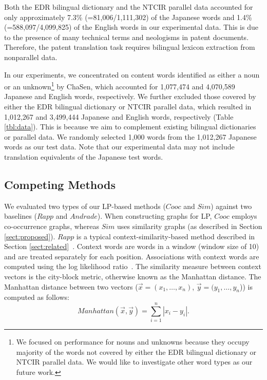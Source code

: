 \documentclass[english]{jnlp_1.4}
\begin{document}
Both the EDR bilingual dictionary and the NTCIR parallel data accounted for only approximately 7.3\% (=81,006/1,111,302) of the Japanese words and 1.4\% (=588,097/4,099,825) of the English words in our experimental data. 
This is due to the presence of many technical terms and neologisms in patent documents. 
Therefore, the patent translation task requires bilingual lexicon extraction from nonparallel data. 

In our experiments, we concentrated on content words identified as either a noun or an unknown\footnote{We focused on performance for nouns and unknowns because they occupy majority of the words not covered by either the EDR bilingual dictionary or NTCIR parallel data. We would like to investigate other word types as our future work.} by ChaSen, which accounted for 1,077,474 and 4,070,589 Japanese and English words, respectively. 
We further excluded those covered by either the EDR bilingual dictionary or NTCIR parallel data, which resulted in 1,012,267 and 3,499,444 Japanese and English words, respectively (Table \ref{tbl:data}). 
This is because we aim to complement existing bilingual dictionaries or parallel data. 
We randomly selected 1,000 words from the 1,012,267 Japanese words as our test data. 
Note that our experimental data may not include translation equivalents of the Japanese test words. 


\subsection{Competing Methods}
\label{sect:method}

We evaluated two types of our LP-based methods ($\mathit{Cooc}$ and $\mathit{Sim}$) against two baselines ($\mathit{Rapp}$ and $\mathit{Andrade}$). 
When constructing graphs for LP, $\mathit{Cooc}$ employs co-occurrence graphs, whereas $\mathit{Sim}$ uses similarity graphs (as described in Section \ref{sect:proposed}). 
$\mathit{Rapp}$ is a typical context-similarity-based method described in Section \ref{sect:related}~\cite{rapp99}. 
Context words are words in a window (window size of 10) and are treated separately for each position. 
Associations with context words are computed using the log likelihood ratio~\cite{dunning93}. 
The similarity measure between context vectors is the city-block metric, otherwise known as the Manhattan distance. 
The Manhattan distance between two vectors ($\vec{x}=(x_{1},\ldots,x_{n})$, $\vec{y}=(y_{1},\ldots,y_{n}$)) is computed as follows: 
\begin{equation}
\mathit{Manhattan}(\vec{x},\vec{y})=\sum^{n}_{i=1}|x_{i}-y_{i}|. 
\end{equation}
\end{document}
